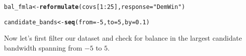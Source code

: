 \documentclass[11pt,leqno]{article}\usepackage[]{graphicx}\usepackage[]{color}
\makeatletter
\newcommand{\hlnum}[1]{\textcolor[rgb]{0.686,0.059,0.569}{#1}}%
\newcommand{\hlstr}[1]{\textcolor[rgb]{0.192,0.494,0.8}{#1}}%
\newcommand{\hlopt}[1]{\textcolor[rgb]{0,0,0}{#1}}%
\newcommand{\hlstd}[1]{\textcolor[rgb]{0.345,0.345,0.345}{#1}}%
\newcommand{\hlkwb}[1]{\textcolor[rgb]{0.69,0.353,0.396}{#1}}%
\newcommand{\hlkwc}[1]{\textcolor[rgb]{0.333,0.667,0.333}{#1}}%
\newcommand{\hlkwd}[1]{\textcolor[rgb]{0.737,0.353,0.396}{\textbf{#1}}}%
\newenvironment{kframe}{%
 \def\at@end@of@kframe{}%
 \ifinner\ifhmode%
  \def\at@end@of@kframe{\end{minipage}}%
  \begin{minipage}{\columnwidth}%
 \fi\fi%
 \def\FrameCommand##1{\hskip\@totalleftmargin \hskip-\fboxsep
 \colorbox{shadecolor}{##1}\hskip-\fboxsep
     \hskip-\linewidth \hskip-\@totalleftmargin \hskip\columnwidth}%
 \MakeFramed {\advance\hsize-\width
   \@totalleftmargin\z@ \linewidth\hsize
   \@setminipage}}%
 {\par\unskip\endMakeFramed%
 \at@end@of@kframe}
\newenvironment{knitrout}{}{} %
\theoremstyle{newstyle}
\makeatother
\begin{document}
\begin{knitrout}\footnotesize
{}\color{fgcolor}\begin{kframe}
\begin{alltt}
\hlstd{bal_fmla} \hlkwb{<-} \hlkwd{reformulate}\hlstd{(covs[}\hlnum{1}\hlopt{:}\hlnum{25}\hlstd{],} \hlkwc{response} \hlstd{=} \hlstr{"DemWin"}\hlstd{)}

\hlstd{candidate_bands} \hlkwb{<-} \hlkwd{seq}\hlstd{(}\hlkwc{from} \hlstd{=} \hlopt{-}\hlnum{5}\hlstd{,} \hlkwc{to} \hlstd{=} \hlnum{5}\hlstd{,} \hlkwc{by} \hlstd{=} \hlnum{0.1}\hlstd{)}
\end{alltt}
\end{kframe}
\end{knitrout}

Now let's first filter our dataset and check for balance in the largest candidate bandwidth spanning from $-5$ to $5$.
\end{document}
